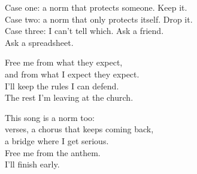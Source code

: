 \begin{lyrics}
Case one: a norm that protects someone. Keep it.\\
Case two: a norm that only protects itself. Drop it.\\
Case three: I can't tell which. Ask a friend.\\
Ask a spreadsheet.

Free me from what they expect,\\
and from what I expect they expect.\\
I'll keep the rules I can defend.\\
The rest I'm leaving at the church.

This song is a norm too:\\
verses, a chorus that keeps coming back,\\
a bridge where I get serious.\\
Free me from the anthem.\\
I'll finish early.
\end{lyrics}

